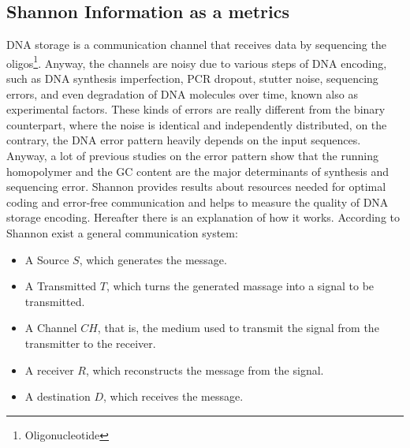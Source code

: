 \documentclass[10pt,twocolumn,twoside]{gsajnl}
\begin{document}

\subsection{Shannon Information as a metrics}
DNA storage is a communication channel that receives data by sequencing the oligos\footnote{Oligonucleotide}. Anyway, the channels are noisy due to various steps of DNA encoding, such as DNA synthesis imperfection, PCR dropout, stutter noise, sequencing errors, and even degradation of DNA molecules over time, known also as experimental factors.
These kinds of errors are really different from the binary counterpart, where the noise is identical and independently distributed, on the contrary, the DNA error pattern heavily depends on the input sequences.
Anyway, a lot of previous studies on the error pattern show that the running homopolymer and the GC content are the major determinants of synthesis and sequencing error.
Shannon provides results about resources needed for optimal coding and error-free communication and helps to measure the quality of DNA storage encoding.
Hereafter there is an explanation of how it works.
According to Shannon exist a general communication system:
\begin{itemize}
    \item A Source $S$, which generates the message.
    \item A Transmitted $T$, which turns the generated massage into a signal to be transmitted.
    \item A Channel $CH$, that is, the medium used to transmit the signal from the transmitter to the receiver.
    \item A receiver $R$, which reconstructs the message from the signal.
    \item A destination $D$, which receives the message.
\end{itemize}
\end{document}
